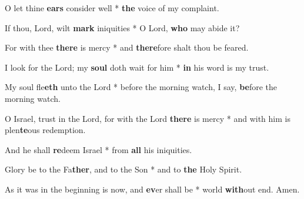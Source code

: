 \begin{multicols}{2}
	O let thine \textbf{ears} consider well * \textbf{the} voice of my complaint.
	
	If thou, Lord, wilt \textbf{mark} iniquities * O Lord, \textbf{who} may abide it?
	
	For with thee \textbf{there} is mercy  * and \textbf{there}fore shalt thou be feared.
	
	I look for the Lord; my \textbf{soul} doth wait for him * \textbf{in} his word is my trust.
	
	My soul fle\textbf{eth} unto the Lord * before the morning watch, I say, \textbf{be}fore the morning watch.
	
	O Israel, trust in the Lord, for with the Lord \textbf{there} is mercy * and with him is plen\textbf{te}ous redemption.
	
	And he shall \textbf{re}deem Israel * from \textbf{all} his iniquities.
	
	Glory be to the Fa\textbf{ther}, and to the Son * and to \textbf{the} Holy Spirit.
	
	As it was in the beginning is now, and \textbf{ev}er shall be * world \textbf{with}out end. Amen.
\end{multicols}